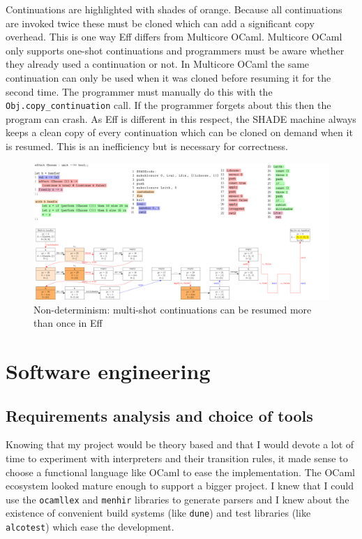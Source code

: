 \documentclass[class=article, crop=false]{standalone}
\begin{document}
Continuations are highlighted with shades of orange. Because all continuations
are invoked twice these must be cloned which can add a significant copy overhead.
This is one way Eff differs from Multicore OCaml. Multicore OCaml only supports
one-shot continuations and programmers must be aware whether they already used
a continuation or not. In Multicore OCaml the same continuation can only be used
when it was cloned before resuming it for the second time. The programmer must
manually do this with the \lstinline|Obj.copy_continuation| call. If the
programmer forgets about this then the program can crash. As Eff is different
in this respect, the SHADE machine always keeps a clean copy of every
continuation which can be cloned on demand when it is resumed.
This is an inefficiency but is necessary for correctness.

\begin{landscape}
    \begin{figure}
        \centering
        \includegraphics[width=\paperwidth]{../figures/impl-two-resume.pdf}
        \caption[Implementation of multi-shot continuations]{Non-determinism: multi-shot continuations can be resumed more than once in Eff}
        \label{fig:shadecode-two-resume}
    \end{figure}
\end{landscape}

\section{Software engineering}

\subsection{Requirements analysis and choice of tools}

Knowing that my project would be theory based and that I would devote a lot of
time to experiment with interpreters and their transition rules, it made sense
to choose a functional language like OCaml to ease the implementation.
The OCaml ecosystem looked mature enough to support a bigger project. I knew
that I could use the \lstinline|ocamllex| and \lstinline|menhir| libraries to
generate parsers and I knew about the existence of convenient build systems
(like \lstinline|dune|) and test libraries (like \lstinline|alcotest|)
which ease the development.
\end{document}
